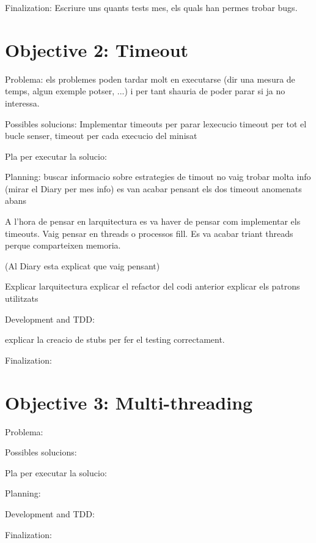 Finalization:
Escriure uns quants tests mes, els quals han permes trobar bugs.

\section{Objective 2: Timeout}

Problema:
els problemes poden tardar molt en executarse (dir una mesura de temps, algun exemple potser, ...) i per tant shauria de poder parar si ja no interessa.

Possibles solucions:
Implementar timeouts per parar lexecucio
timeout per tot el bucle senser, timeout per cada execucio del minisat

Pla per executar la solucio:

Planning:
buscar informacio sobre estrategies de timout
no vaig trobar molta info (mirar el Diary per mes info)
es van acabar pensant els dos timeout anomenats abans

A l'hora de pensar en larquitectura es va haver de pensar com implementar els timeouts. Vaig pensar en threads o processos fill. Es va acabar triant threads perque comparteixen memoria.

(Al Diary esta explicat que vaig pensant)

Explicar larquitectura 
explicar el refactor del codi anterior
explicar els patrons utilitzats

Development and TDD:

explicar la creacio de stubs per fer el testing correctament.


Finalization:


\section{Objective 3: Multi-threading}

Problema:

Possibles solucions:

Pla per executar la solucio:

Planning:

Development and TDD:

Finalization: